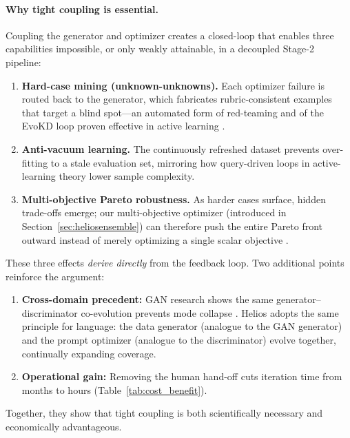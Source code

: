 \documentclass{article}
\begin{document}
\paragraph{Why tight coupling is essential.} Coupling the generator and optimizer creates a closed-loop that enables three capabilities impossible, or only weakly attainable, in a decoupled Stage-2 pipeline:

\begin{enumerate}
  \item \textbf{Hard-case mining (unknown-unknowns).} Each optimizer failure is routed back to the generator, which fabricates rubric-consistent examples that target a blind spot—an automated form of red-teaming \citep{perez2022redteaminglanguagemodels} and of the EvoKD loop proven effective in active learning \citep{liu2024evolvingknowledgedistillationlarge}.

  \item \textbf{Anti-vacuum learning.} The continuously refreshed dataset prevents over-fitting to a stale evaluation set, mirroring how query-driven loops in active-learning theory lower sample complexity.  

  \item \textbf{Multi-objective Pareto robustness.} As harder cases surface, hidden trade-offs emerge; our multi-objective optimizer (introduced in Section~\ref{sec:heliosensemble}) can therefore push the entire Pareto front outward instead of merely optimizing a single scalar objective \citep{zhao2025pareto}.
\end{enumerate}

These three effects \emph{derive directly} from the feedback loop. Two additional points reinforce the argument:

\begin{enumerate}
  \item \textbf{Cross-domain precedent:} GAN research shows the same generator–discriminator co-evolution prevents mode collapse \citep{arjovsky2017wassersteingan, karras2020analyzingimprovingimagequality}. Helios adopts the same principle for language: the data generator (analogue to the GAN generator) and the prompt optimizer (analogue to the discriminator) evolve together, continually expanding coverage.
  \item \textbf{Operational gain:} Removing the human hand-off cuts iteration time from months to hours (Table~\ref{tab:cost_benefit}).
\end{enumerate}

Together, they show that tight coupling is both scientifically necessary and economically advantageous.
\end{document}
